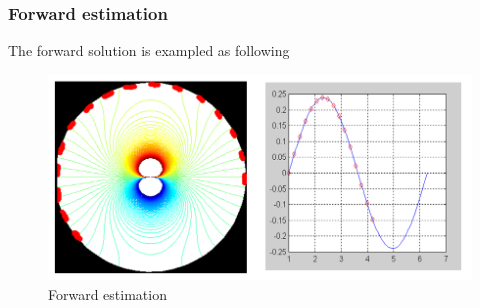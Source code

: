 \documentclass{beamer}
\begin{document}
\begin{frame}
    \frametitle{Forward estimation}
    The forward solution is exampled as following
    \begin{figure}[H]
        \centering
        \includegraphics[height=0.5\textheight]{Forward_estimation.png}
        \caption{Forward estimation}
        \label{fig: Forward estimation}
    \end{figure}
\end{frame}
\end{document}
